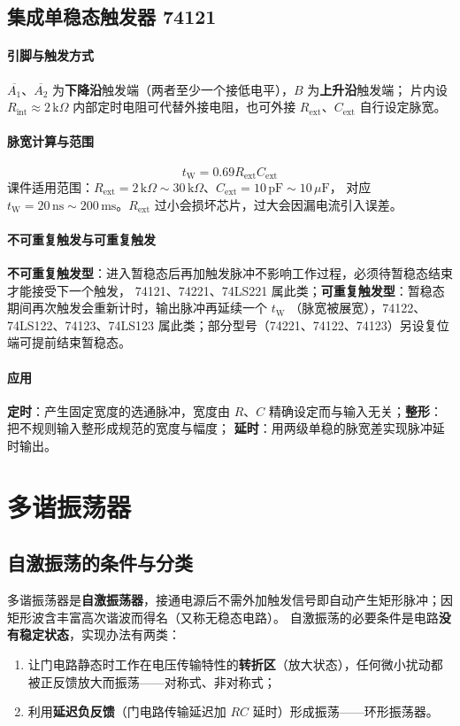 \subsection{集成单稳态触发器 74121}
\paragraph{引脚与触发方式}
$\overline{A_1}$、$\overline{A_2}$ 为\textbf{下降沿}触发端（两者至少一个接低电平），$B$ 为\textbf{上升沿}触发端；
片内设 $R_\text{int}\approx2\,\mathrm{k}\Omega$ 内部定时电阻可代替外接电阻，也可外接 $R_\text{ext}$、$C_\text{ext}$ 自行设定脉宽。

\paragraph{脉宽计算与范围}
\[
t_\text{W}=0.69R_\text{ext}C_\text{ext}
\]
课件适用范围：$R_\text{ext}=2\,\mathrm{k}\Omega\sim30\,\mathrm{k}\Omega$、$C_\text{ext}=10\,\mathrm{pF}\sim10\,\mu\mathrm{F}$，
对应 $t_\text{W}=20\,\mathrm{ns}\sim200\,\mathrm{ms}$。$R_\text{ext}$ 过小会损坏芯片，过大会因漏电流引入误差。

\paragraph{不可重复触发与可重复触发}
\textbf{不可重复触发型}：进入暂稳态后再加触发脉冲不影响工作过程，必须待暂稳态结束才能接受下一个触发，
74121、74221、74LS221 属此类；\textbf{可重复触发型}：暂稳态期间再次触发会重新计时，输出脉冲再延续一个 $t_\text{W}$
（脉宽被展宽），74122、74LS122、74123、74LS123 属此类；部分型号（74221、74122、74123）另设复位端可提前结束暂稳态。

\paragraph{应用}
\textbf{定时}：产生固定宽度的选通脉冲，宽度由 $R$、$C$ 精确设定而与输入无关；\textbf{整形}：把不规则输入整形成规范的宽度与幅度；
\textbf{延时}：用两级单稳的脉宽差实现脉冲延时输出。

\section{多谐振荡器}
\subsection{自激振荡的条件与分类}
多谐振荡器是\textbf{自激振荡器}，接通电源后不需外加触发信号即自动产生矩形脉冲；因矩形波含丰富高次谐波而得名（又称无稳态电路）。
自激振荡的必要条件是电路\textbf{没有稳定状态}，实现办法有两类：
\begin{enumerate}
    \item 让门电路静态时工作在电压传输特性的\textbf{转折区}（放大状态），任何微小扰动都被正反馈放大而振荡——对称式、非对称式；
    \item 利用\textbf{延迟负反馈}（门电路传输延迟加 $RC$ 延时）形成振荡——环形振荡器。
\end{enumerate}

